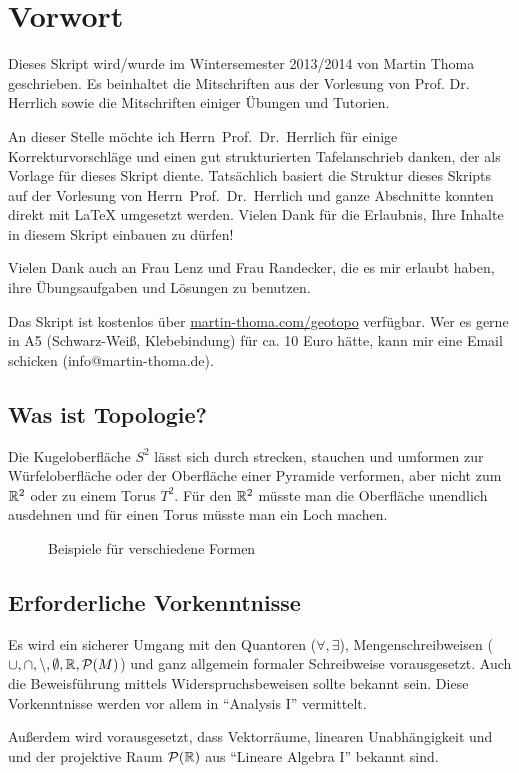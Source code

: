 \chapter*{Vorwort}
Dieses Skript wird/wurde im Wintersemester 2013/2014
von Martin Thoma geschrieben. Es beinhaltet die Mitschriften aus
der Vorlesung von Prof. Dr. Herrlich sowie die Mitschriften einiger
Übungen und Tutorien.

An dieser Stelle möchte ich Herrn~Prof.~Dr.~Herrlich für einige 
Korrekturvorschläge und einen gut strukturierten Tafelanschrieb 
danken, der als Vorlage für dieses Skript diente. Tatsächlich basiert
die Struktur dieses Skripts auf der Vorlesung von Herrn~Prof.~Dr.~Herrlich
und ganze Abschnitte konnten direkt mit \LaTeX{} umgesetzt werden.
Vielen Dank für die Erlaubnis, Ihre Inhalte in diesem Skript einbauen
zu dürfen!

Vielen Dank auch an Frau Lenz und Frau Randecker, die es mir erlaubt 
haben, ihre Übungsaufgaben und Lösungen zu benutzen.

Das Skript ist kostenlos über \href{http://martin-thoma.com/geotopo/}{martin-thoma.com/geotopo}
verfügbar. Wer es gerne in A5 (Schwarz-Weiß, Klebebindung) für ca. 10 Euro hätte, 
kann mir eine Email schicken (info@martin-thoma.de).

\section*{Was ist Topologie?}

Die Kugeloberfläche $S^2$ lässt sich durch strecken, stauchen
und umformen zur Würfeloberfläche oder
der Oberfläche einer Pyramide verformen, aber nicht zum $\mdr^2$
oder zu einem Torus $T^2$. Für den $\mdr^2$ müsste man die Oberfläche
unendlich ausdehnen und für einen Torus müsste man ein Loch machen.

\begin{figure}[ht]
    \centering
    \subfloat[$S^2$]{
        
        \label{fig:s2}
    }%
    \subfloat[Würfel]{
        
        \label{fig:cube}
    }%
    \subfloat[Pyramide]{
        
        \label{fig:pyramide}
    }

    \subfloat[$\mdr^2$]{
        
        \label{fig:plane-r2}
    }%
    \label{Formen}
    \caption{Beispiele für verschiedene Formen}
\end{figure}

\section*{Erforderliche Vorkenntnisse}
Es wird ein sicherer Umgang mit den Quantoren ($\forall, \exists$),
Mengenschreibweisen ($\cup, \cap, \setminus, \emptyset, \mathbb{R}, \mathcal{P}(M)$)
und ganz allgemein formaler Schreibweise vorausgesetzt. Auch die
Beweisführung mittels Widerspruchsbeweisen sollte bekannt sein.
Diese Vorkenntnisse werden vor allem in \enquote{Analysis I} vermittelt.

Außerdem wird vorausgesetzt, dass Vektorräume, linearen Unabhängigkeit
und und der projektive Raum $\mathcal{P}(\mathbb{R})$ aus \enquote{Lineare Algebra I}
bekannt sind.
